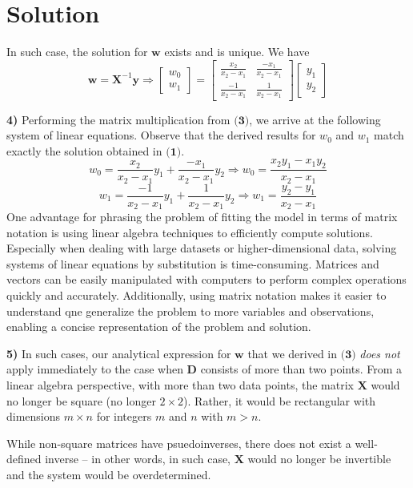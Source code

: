 \documentclass{harvardml}
\theoremstyle{definition}
\theoremstyle{plain}
\newenvironment{solution}
  {\color{blue}\section*{Solution}}
{}
\begin{document}
\begin{solution}
In such case, the solution for $\textbf{w}$ exists and is unique. We have
$$
\textbf{w} = \textbf{X}^{-1}\textbf{y} \Rightarrow \begin{bmatrix}
    w_{0}\\
    w_{1}
\end{bmatrix} = \begin{bmatrix}
    \frac{x_{2}}{x_{2} - x_{1}} & \frac{-x_{1}}{x_{2} - x_{1}}\\
    \frac{-1}{x_{2} - x_{1}} & \frac{1}{x_{2} - x_{1}}
\end{bmatrix} \begin{bmatrix}
    y_{1} \\
    y_{2}
\end{bmatrix}
$$

\textbf{4) } Performing the matrix multiplication from $\textbf{(3)}$, we arrive at the following system of linear equations. Observe that the derived results for $w_{0}$ and $w_{1}$ match exactly the solution obtained in $\textbf{(1)}$. 
$$
w_{0} = \frac{x_{2}}{x_{2} - x_{1}}y_{1} + \frac{-x_{1}}{x_{2} - x_{1}}y_{2} \Rightarrow w_{0} = \frac{x_{2}y_{1} - x_{1}y_{2}}{x_{2} - x_{1}}
$$
$$
w_{1} = \frac{-1}{x_{2} - x_{1}}y_{1} + \frac{1}{x_{2} - x_{1}}y_{2} \Rightarrow w_{1} = \frac{y_{2} - y_{1}}{x_{2} - x_{1}}
$$
One advantage for phrasing the problem of fitting the model in terms of matrix notation is using linear algebra techniques to efficiently compute solutions. Especially when dealing with large datasets or higher-dimensional data, solving systems of linear equations by substitution is time-consuming. Matrices and vectors can be easily manipulated with computers to perform complex operations quickly and accurately. Additionally, using matrix notation makes it easier to understand qne generalize the problem to more variables and observations, enabling a concise representation of the problem and solution.

\textbf{5) } In such cases, our analytical expression for $\textbf{w}$ that we derived in $\textbf{(3)}$ \textit{does not }apply immediately to the
case when $\textbf{D}$ consists of more than two points. From a linear algebra perspective, with more than two data points, the matrix $\textbf{X}$ would no longer be square (no longer $2 \times 2$). Rather, it would be rectangular with dimensions $m \times n$ for integers $m$ and $n$ with $m > n$. 

While non-square matrices have psuedoinverses, there does not exist a well-defined inverse -- in other words, in such case, $\textbf{X}$ would no longer be invertible and the system would be overdetermined. 

\end{solution}
\end{document}
